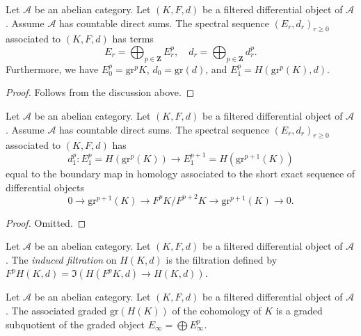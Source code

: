 \begin{lemma}
\label{lemma-spectral-sequence-filtered-differential}
Let $\mathcal{A}$ be an abelian category.
Let $(K, F, d)$ be a filtered differential object of $\mathcal{A}$.
Assume $\mathcal{A}$ has countable direct sums.
The spectral sequence $(E_r, d_r)_{r \geq 0}$
associated to $(K, F, d)$ has terms
$$
E_r = \bigoplus\nolimits_{p \in \mathbf{Z}} E_r^p,
\quad
d_r = \bigoplus\nolimits_{p \in \mathbf{Z}} d_r^p.
$$
Furthermore, we have
$E_0^p = \text{gr}^p K$, $d_0 = \text{gr}(d)$,
and $E_1^p = H(\text{gr}^p(K), d)$.
\end{lemma}

\begin{proof}
Follows from the discussion above.
\end{proof}

\begin{lemma}
\label{lemma-spectral-sequence-filtered-differential-d1}
Let $\mathcal{A}$ be an abelian category.
Let $(K, F, d)$ be a filtered differential object of $\mathcal{A}$.
Assume $\mathcal{A}$ has countable direct sums.
The spectral sequence $(E_r, d_r)_{r \geq 0}$
associated to $(K, F, d)$ has
$$
d_1^p :
E_1^p = H(\text{gr}^p(K))
\longrightarrow
E_1^{p + 1} = H(\text{gr}^{p + 1}(K))
$$
equal to the boundary map in homology associated to the short
exact sequence of differential objects
$$
0 \to \text{gr}^{p + 1}(K) \to F^pK/F^{p + 2}K \to \text{gr}^{p + 1}(K) \to 0.
$$
\end{lemma}

\begin{proof}
Omitted.
\end{proof}

\begin{definition}
\label{definition-filtration-cohomology-filtered-differential}
Let $\mathcal{A}$ be an abelian category.
Let $(K, F, d)$ be a filtered differential object of $\mathcal{A}$.
The {\it induced filtration} on $H(K, d)$ is the filtration defined
by $F^pH(K, d) = \Im(H(F^pK, d) \to H(K, d))$.
\end{definition}

\begin{lemma}
\label{lemma-compute-filtered-cohomology}
Let $\mathcal{A}$ be an abelian category.
Let $(K, F, d)$ be a filtered differential object of $\mathcal{A}$.
The associated graded $\text{gr}(H(K))$ of the cohomology of
$K$ is a graded subquotient of the graded object
$E_\infty = \bigoplus E_\infty^p$.
\end{lemma}


